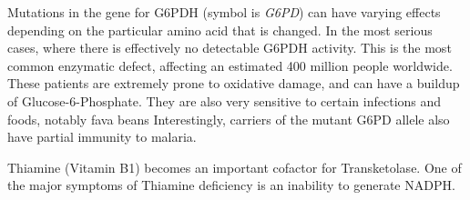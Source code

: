 \documentclass{tufte-handout}
\begin{document}
Mutations in the gene for G6PDH (symbol is \textit{G6PD}) can have varying effects depending on the particular amino acid that is changed.  In the most serious cases, where there is effectively no detectable G6PDH activity.  This is the most common enzymatic defect, affecting an estimated 400 million people worldwide.  These patients are extremely prone to oxidative damage, and can have a buildup of Glucose-6-Phosphate.  They are also very sensitive to certain infections and foods, notably fava beans  Interestingly, carriers of the mutant G6PD allele also have partial immunity to malaria.

  Thiamine (Vitamin B1) becomes an important cofactor for Transketolase.  One of the major symptoms of Thiamine deficiency is an inability to generate NADPH.



\end{document}
